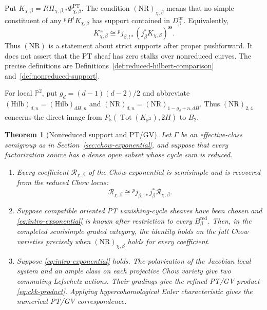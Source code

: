 \documentclass[11pt,reqno]{amsart}
\newtheorem{theorem}{Theorem}[section]
\theoremstyle{definition}
\newcommand{\Pp}{\mathbb P}
\newcommand{\Tot}{\operatorname{Tot}}
\newcommand{\PT}{\operatorname{PT}}
\newcommand{\red}{\mathrm{red}}
\newcommand{\nr}{\mathrm{nr}}
\begin{document}
Put $K_{\chi,\beta}=R\Pi_{\chi,\beta,*}\Phi_{\chi,\beta}^{\PT}$.  The
condition $(\mathrm{NR})_{\chi,\beta}$ means that no simple constituent of
any ${}^pH^iK_{\chi,\beta}$ has support contained in $D_\beta^{\nr}$.
Equivalently,
\begin{equation}\label{eq:intro-nr-condition}
 K_{\chi,\beta}^{\mathrm{ss}}
 \cong{}^pj_{\beta,!*}
       (j_\beta^*K_{\chi,\beta})^{\mathrm{ss}}.
\end{equation}
Thus $(\mathrm{NR})$ is a statement about strict supports after proper
pushforward.  It does not assert that the PT sheaf has zero stalks over
nonreduced curves.  The precise definitions are
Definitions~\ref{def:reduced-hilbert-comparison}
and~\ref{def:nonreduced-support}.

For local $\Pp^2$, put $g_d=(d-1)(d-2)/2$ and abbreviate
$(\mathrm{Hilb})_{d,n}=(\mathrm{Hilb})_{dH,n}$ and
$(\mathrm{NR})_{d,n}=(\mathrm{NR})_{1-g_d+n,dH}$.  Thus
$(\mathrm{NR})_{2,4}$ concerns the direct image from
$P_5(\Tot(K_{\Pp^2}),2H)$ to $B_2$.

\begin{theorem}[Nonreduced support and PT/GV]
\label{thm:intro-chow}
Let $\Gamma$ be an effective-class semigroup as in
Section~\ref{sec:chow-exponential}, and suppose that every factorization source has
a dense open subset whose cycle sum is reduced.

\begin{enumerate}[label=\textnormal{(\roman*)},leftmargin=9mm]
\item Every coefficient $\mathcal R_{\chi,\beta}$ of the Chow exponential is
semisimple and is recovered from the reduced Chow locus:
\[
 \mathcal R_{\chi,\beta}
 \cong{}^pj_{\beta,!*}j_\beta^*\mathcal R_{\chi,\beta}.
\]

\item Suppose compatible oriented PT vanishing-cycle sheaves have been
chosen and \eqref{eq:intro-exponential} is known after restriction to every
$B_\beta^{\red}$.  Then, in the completed semisimple graded category, the
identity holds on the full Chow varieties precisely when
$(\mathrm{NR})_{\chi,\beta}$ holds for every coefficient.

\item Suppose \eqref{eq:intro-exponential} holds.  The polarization of the
Jacobian local system and an ample class on each projective Chow variety
give two commuting Lefschetz actions.  Their gradings give the refined PT/GV product
\eqref{eq:ckk-product}.  Applying hypercohomological Euler characteristic
gives the numerical PT/GV correspondence.
\end{enumerate}
\end{theorem}
\end{document}
